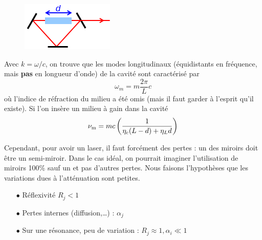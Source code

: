 \newpage
	\begin{figure}
	\vspace{-2mm}
	\includegraphics[scale=0.6]{ch3/image3.png}
	\end{figure}
Avec $k=\omega/c$, on trouve que les modes 
longitudinaux (équidistants en fréquence, mais \textbf{pas} en longueur d'onde) de la cavité sont caractérisé par 
\begin{equation}
\omega_m = m\dfrac{2\pi}{L}c
\end{equation}
où l'indice de réfraction du milieu a été omis (mais il faut garder à l'esprit qu'il existe). Si 
l'on insère un milieu à gain dans la cavité
\begin{equation}
{\nu _{\rm{m}}} = mc\left(\frac{1}{{{\eta _c}(L - d) + {\eta _L}d}}\right)
\end{equation}

Cependant, pour avoir un laser, il faut forcément des pertes : un des miroirs doit être un 
semi-miroir. Dans le cas idéal, on pourrait imaginer l'utilisation de miroirs 100\% sauf un 
et pas d'autres pertes. Nous faisons l'hypothèses que les variations dues à l'atténuation sont 
petites.
\begin{itemize}
\item[$\bullet$] Réflexivité $R_j<1$
\item[$\bullet$] Pertes internes (diffusion,\dots) : $\alpha_j$
\item[$\bullet$] Sur une résonance, peu de variation : $R_j\approx1, \alpha_i\ll 1$
\end{itemize}\ 


